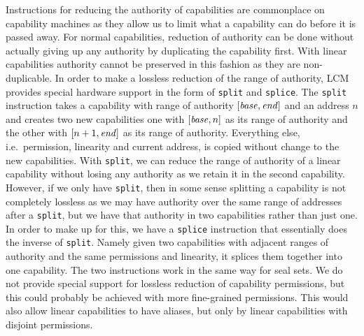 \documentclass[acmsmall,review,anonymous]{acmart}\settopmatter{printfolios=true,printccs=false,printacmref=false}
\newcommand{\trgcm}{\textsc{LCM}}
\begin{document}
Instructions for reducing the authority of capabilities are commonplace on capability machines as they allow us to limit what a capability can do before it is passed away.
For normal capabilities, reduction of authority can be done without actually giving up any authority by duplicating the capability first.
With linear capabilities authority cannot be preserved in this fashion as they are non-duplicable.
In order to make a lossless reduction of the range of authority, \trgcm{} provides special hardware support in the form of \texttt{split} and \texttt{splice}.
The \texttt{split} instruction takes a capability with range of authority $[\mathit{base},\mathit{end}]$ and an address $n$ and creates two new capabilities one with $[\mathit{base},n]$ as its range of authority and the other with $[n+1,\mathit{end}]$ as its range of authority.
Everything else, i.e.\ permission, linearity and current address, is copied without change to the new capabilities.
With \texttt{split}, we can reduce the range of authority of a linear capability without losing any authority as we retain it in the second capability.
However, if we only have \texttt{split}, then in some sense splitting a capability is not completely lossless as we may have authority over the same range of addresses after a \texttt{split}, but we have that authority in two capabilities rather than just one.
In order to make up for this, we have a \texttt{splice} instruction that essentially does the inverse of \texttt{split}.
Namely given two capabilities with adjacent ranges of authority and the same permissions and linearity, it splices them together into one capability.
The two instructions work in the same way for seal sets.
We do not provide special support for lossless reduction of capability permissions, but this could probably be achieved with more fine-grained permissions.
This would also allow linear capabilities to have aliases, but only by linear capabilities with disjoint permissions.
\end{document}
